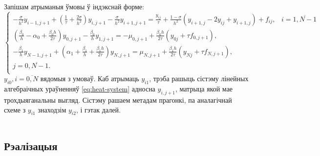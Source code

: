 Запішам атрыманыя ўмовы ў індэкснай форме:
\begin{equation} \label{eq:heat-system}
	\begin{cases}
	-\frac{\sigma}{h^2}y_{i-1, j+1} + (\frac{1}{\tau} + \frac{2\sigma}{h^2})y_{i, j+1} -\frac{\sigma}{h^2}y_{i+1, j+1} = \frac{y_{ij}}{\tau} + \frac{1-\sigma}{h^2}(y_{i+1, j} -2y_{ij} + y_{i+1, j}) + f _{ij}, \hspace{10pt} i = \overline{1, N-1}\\
	(\frac{\beta _0}{h} - \alpha _0 + \frac{\beta _0 h}{2\tau})y_{0, j+1} - \frac{\beta _0}{h} y_{1, j+1} = -\mu _{0, j+1} + \frac{\beta _0 h}{2 \tau}(y_{0j} + \tau f _{0, j+1}),  \\
	-\frac{\beta _1}{h}y_{N-1, j+1} + (\alpha _1 + \frac{\beta _1}{h} + \frac{\beta _1 h}{2 \tau})y_{N, j+1} = \mu _{N, j+1} + \frac{\beta _1 h}{2 \tau}(y_{Nj} + \tau f_{N, j+1}), \\
	j = \overline{0, N-1}. \\
	\end{cases}
\end{equation}
$y_{i0}, i = \overline{0, N}$ вядомыя з умоваў. Каб атрымаць $y_{i1}$, трэба рашыць сістэму лінейных алгебраічных ураўненняў \eqref{eq:heat-system} адносна $y_{i, j+1}$, матрыца якой мае трохдыяганальны выгляд. Сістэму рашаем метадам прагонкі, па аналагічнай схеме з $y_{i1}$ знаходзім $y_{i2}$, і гэтак далей. \\ \\

\subsection*{Рэалізацыя}

